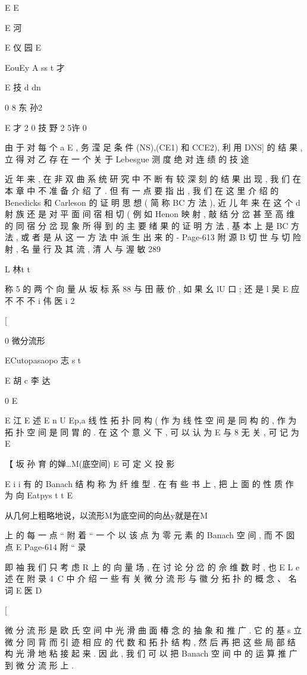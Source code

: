 {E
E

E 河

E 仪
园
E

EouEy A ss t 才

E 技 d dn

0 8 东 孙2

E 才 2
0 技 野 2 5许
0

由 于 对 每 个 a E , 务 滢 足 条 件 (NS),(CE1) 和 CCE2), 利 用
DNS] 的 结 果 , 立 得 对 乙 存 在 一 个 关 于 Lebesgue 测 度 绝 对 连 绩 的
技 途

近 年 来 , 在 非 双 曲 系 统 研 究 中 不 断 有 较 深 刻 的 结 果 出 现 , 我 们
在 本 章 中 不 准 备 介 绍 了 . 但 有 一 点 要 指 出 , 我 们 在 这 里 介 绍 的
Benedicks 和 Carleson 的 证 明 思 想 ( 简 称 BC 方 法 ), 近 儿 年 来 在 这 个
d
射 族 还 是 对 平 面 间 宿 相 切 ( 例 如 Henon 映 射 , 敲 结 分 岔 甚 至 高 维
的 同 宿 分 岔 现 象 所 得 到 的 主 要 绪 果 的 证 明 方 法 , 基 本 上 是 BC 方
法 , 或 者 是 从 这 一 方 法 中 派 生 出 来 的 -
Page-613
附 源 B 切 世 与 切 险 射 , 名 量 行 及 其 流 , 清 人 与 渥 敏 289

L 林t t

称 5 的 两 个 向 量 从 坂 标 系 88 与 田 蔽 价 , 如 果 幺 lU 口 ; 还 是
l 吴
E 应 不 不 不 i
伟
医 i 2

[

0 微分流形

ECutopasaopo 志 s t

E 胡 c 李
达

0
E

E 江
E 述
E n U
Ep,a 线 性 拓 扑 同 构 ( 作 为 线 性 空 间 是 同 构 的 , 作 为 拓 扑 空 间 是 同
胃 的 . 在 这 个 意 义 下 , 可 以 认 为 E 与 8 无 关 , 可 记 为 E

【 坂 孙 育 的婵…M(底空间) E
可 定 义 投 影

E i
i
有 的 Banach 结 构 称 为 纤 维 型 . 在 有 些 书 上 , 把 上 面 的 性 质 作 为 向
Eatpys t t
E

从几何上粗略地说，以流形M为底空间的向丛y就是在M

上 的 每 一 点 “ 附 着 “ 一 个 以 该 点 为 零 元 素 的 Banach 空 间 , 而 不 囡 点
E
Page-614
附 “ 录

即 袖 我 们 只 考 虑 R 上 的 向 量 场 , 在 讨 论 分 岔 的 佘 维 数 时 , 也
E L e
述
在 附 录 4~C 中 介 绍 一 些 有 关 微 分 流 形 与 徽 分 拓 扑 的 概 念 、 名 词
E
医
D

[

微 分 流 形 是 欧 氏 空 间 中 光 滑 曲 面 椿 念 的 抽 象 和 推 广 . 它 的 基
s
立 微 分 同 背 而 引 迹 相 应 的 代 数 和 拓 扑 结 构 , 然 后 再 把 这 些 局 部 结
构 光 滑 地 粘 接 起 来 . 因 此 , 我 们 可 以 把 Banach 空 间 中 的 运 算 推 广
到 微 分 流 形 上 .

}
